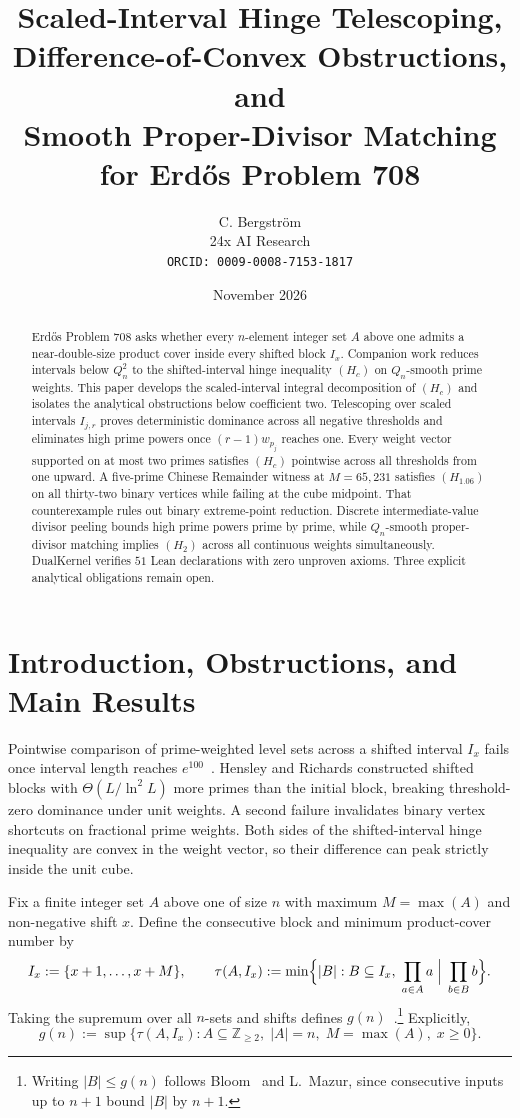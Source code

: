 \documentclass[11pt]{article}
\title{Scaled-Interval Hinge Telescoping, Difference-of-Convex Obstructions, and\\ Smooth Proper-Divisor Matching for Erd\H{o}s Problem 708}
\author{C. Bergstr\"om \\ 24x AI Research \\ \texttt{ORCID: 0009-0008-7153-1817}}
\date{November 2026}
\begin{document}
\maketitle

\begin{abstract}
Erd\H{o}s Problem 708 asks whether every $n$-element integer set $A$ above one admits a near-double-size product cover inside every shifted block $I_x$. Companion work reduces intervals below $Q_n^2$ to the shifted-interval hinge inequality $(H_c)$ on $Q_n$-smooth prime weights. This paper develops the scaled-interval integral decomposition of $(H_c)$ and isolates the analytical obstructions below coefficient two. Telescoping over scaled intervals $I_{j, r}$ proves deterministic dominance across all negative thresholds and eliminates high prime powers once $(r - 1) w_{p_j}$ reaches one. Every weight vector supported on at most two primes satisfies $(H_c)$ pointwise across all thresholds from one upward. A five-prime Chinese Remainder witness at $M = 65{,}231$ satisfies $(H_{1.06})$ on all thirty-two binary vertices while failing at the cube midpoint. That counterexample rules out binary extreme-point reduction. Discrete intermediate-value divisor peeling bounds high prime powers prime by prime, while $Q_n$-smooth proper-divisor matching implies $(H_2)$ across all continuous weights simultaneously. DualKernel verifies $51$ Lean declarations with zero unproven axioms. Three explicit analytical obligations remain open.
\end{abstract}

\section{Introduction, Obstructions, and Main Results}

Pointwise comparison of prime-weighted level sets across a shifted interval $I_x$ fails once interval length reaches $e^{100}$~\cite{hensleyrichards74}. Hensley and Richards constructed shifted blocks with $\Theta(L / \ln^2 L)$ more primes than the initial block, breaking threshold-zero dominance under unit weights. A second failure invalidates binary vertex shortcuts on fractional prime weights. Both sides of the shifted-interval hinge inequality are convex in the weight vector, so their difference can peak strictly inside the unit cube.

Fix a finite integer set $A$ above one of size $n$ with maximum $M = \max(A)$ and non-negative shift $x$. Define the consecutive block and minimum product-cover number by
\[
I_x := \{x + 1, \dots, x + M\}, \qquad \tau(A, I_x) := \min\Bigl\{ |B| : B \subseteq I_x, \; \prod_{a \in A} a \;\Big|\; \prod_{b \in B} b \Bigr\}.
\]
Taking the supremum over all $n$-sets and shifts defines $g(n)$~\cite{erdossuranyi59}.\footnote{Writing $|B| \le g(n)$ follows Bloom~\cite{bloom708} and L.~Mazur, since consecutive inputs up to $n + 1$ bound $|B|$ by $n + 1$.} Explicitly,
\[
g(n) := \sup\bigl\{ \tau(A, I_x) : A \subseteq \mathbb{Z}_{\ge 2}, \; |A| = n, \; M = \max(A), \; x \ge 0 \bigr\}.
\]
\end{document}
